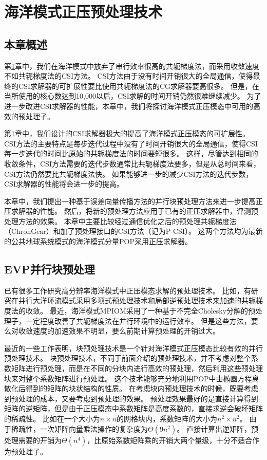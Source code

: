 \chapter{海洋模式正压预处理技术}
\label{cha:precond}

\section{本章概述}

第\ref{cha:precond}章中，我们在海洋模式中放弃了串行效率很高的共轭梯度法，而采用收敛速度不如共轭梯度法的CSI方法。
CSI方法由于没有时间开销很大的全局通信，使得最终的CSI求解器的可扩展性要比使用共轭梯度法的CG求解器要高很多。
但是，在当所使用的核心数达到10,000以后，CSI求解的时间开销仍然很难继续减少。 
为了进一步改进CSI求解器的性能，本章中，我们将探讨海洋模式正压模态中可用的高效的预处理子。

第\ref{cha:precond}章中，我们设计的CSI求解器极大的提高了海洋模式正压模态的可扩展性。
CSI方法的主要特点是每步迭代过程中没有了时间开销很大的全局通信，使得CSI每一步迭代的时间比原始的共轭梯度法的时间要短很多。 
这样，尽管达到相同的收敛条件，CSI方法需要的迭代步数通常比共轭梯度法要多，但是从总时间来看，CSI方法仍然要比共轭梯度法快。
如果能够进一步的减少CSI方法的迭代步数，CSI求解器的性能将会进一步的提高。

本章中，我们提出一种基于误差向量传播方法的并行块预处理方法来进一步提高正压求解器的性能。
然后，将新的预处理方法应用于已有的正压求解器中，评测预处理方法的效果。
本章中主要比较经过通信优化之后的预处理共轭梯度法（ChronGear）和加了预处理接口的CSI方法（记为P-CSI）。
这两个方法均为最新的公共地球系统模式的海洋模式分量POP采用正压求解器\cite{yong2015}。 


\section{EVP并行块预处理} 
\label{precond:EVP}

已有很多工作研究高分辨率海洋模式中正压模态求解的预处理技术。 
比如，有研究在并行大洋环流模式采用多项式预处理技术和局部逆预处理技术来加速的共轭梯度法的收敛\cite{smith1992parallel}。 
最近，海洋模式MPIOM采用了一种基于不完全Cholesky分解的预处理子，一定程度改善了共轭梯度法在并行环境中的运行效率\cite{adamidis2011high}。
但是这些方法，要么对收敛速度的加速效果不明显，要么前期计算预处理的开销过大。 

最近的一些工作表明，块预处理技术是一个针对海洋模式正压模态比较有效的并行预处理技术\cite{concus1985block, white2011block}。
块预处理技术，不同于前面介绍的预处理技术，并不考虑对整个系数矩阵进行预处理，而是在不同的分块内进行高效的预处理，然后利用这些预处理块来对整个系数矩阵进行预处理。 
这个技术能够充分地利用POP中由椭圆方程离散化后得到的矩阵的块状结构的性质。
在考虑块内预处理技术的时候，既要考虑到预处理的成本，又要考虑到预处理的效果。
预处理效果最好的是直接计算得到矩阵的逆矩阵，但是由于正压模态中系数矩阵是高度系数的，直接求逆会破坏矩阵的稀疏性。
比如在一个大小为$n\times n$的网格块内，系数矩阵的大小为$n^2\times n^2$。
由于稀疏性，一次矩阵向量乘法操作的复杂度为$\Theta(9n^2)$。 
直接计算出逆矩阵，预处理需要的开销为$\Theta(n^4)$，比原始系数矩阵乘的开销大两个量级，十分不适合作为预处理子。

